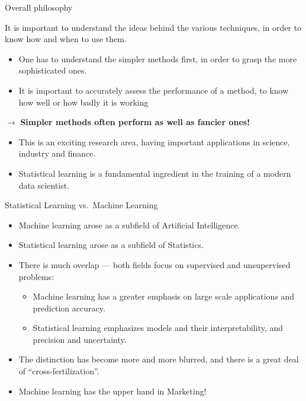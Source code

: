 \documentclass[ignorenonframetext,]{beamer}
\providecommand{\tightlist}{%
  \setlength{\itemsep}{0pt}\setlength{\parskip}{0pt}}
\begin{document}
\begin{frame}{Overall philosophy}

It is important to understand the ideas behind the various techniques,
in order to know how and when to use them.

\begin{itemize}
\item
  One has to understand the simpler methods first, in order to grasp the
  more sophisticated ones.
\item
  It is important to accurately assess the performance of a method, to
  know how well or how badly it is working
\end{itemize}

\(\rightarrow\) \textbf{Simpler methods often perform as well as fancier
ones!}

\begin{itemize}
\item
  This is an exciting research area, having important applications in
  science, industry and finance.
\item
  Statistical learning is a fundamental ingredient in the training of a
  modern data scientist.
\end{itemize}

\end{frame}

\begin{frame}{Statistical Learning vs.~Machine Learning}

\begin{itemize}
\item
  Machine learning arose as a subfield of Artificial Intelligence.
\item
  Statistical learning arose as a subfield of Statistics.
\item
  There is much overlap --- both fields focus on supervised and
  unsupervised problems:

  \begin{itemize}
  \tightlist
  \item
    Machine learning has a greater emphasis on large scale applications
    and prediction accuracy.
  \item
    Statistical learning emphasizes models and their interpretability,
    and precision and uncertainty.
  \end{itemize}
\item
  The distinction has become more and more blurred, and there is a great
  deal of ``cross-fertilization''.
\item
  Machine learning has the upper hand in Marketing!
\end{itemize}

\end{frame}
\end{document}
